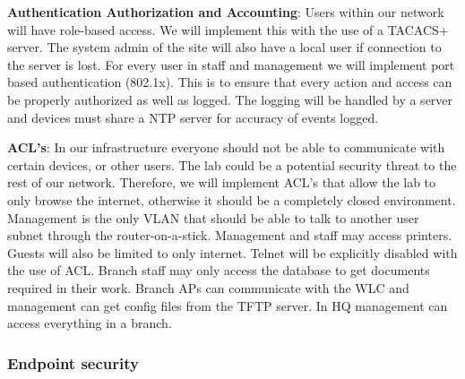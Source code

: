 \textbf{Authentication Authorization and Accounting}: Users within our network will have role-based access. We will implement this with the use of a TACACS+ server. The system admin of the site will also have a local user if connection to the server is lost. For every user in staff and management we will implement port based authentication (802.1x). This is to ensure that every action and access can be properly authorized as well as logged. The logging will be handled by a server and devices must share a NTP server for accuracy of events logged.

\textbf{ACL's}: In our infrastructure everyone should not be able to communicate with certain devices, or other users. The lab could be a potential security threat to the rest of our network. Therefore, we will implement ACL's that allow the lab to only browse the internet, otherwise it should be a completely closed environment. Management is the only VLAN that should be able to talk to another user subnet through the router-on-a-stick. Management and staff may access printers. Guests will also be limited to only internet. Telnet will be explicitly disabled with the use of ACL. Branch staff may only access the database to get documents required in their work. Branch APs can communicate with the WLC and management can get config files from the TFTP server. In HQ management can access everything in a branch.

\subsubsection{Endpoint security}

